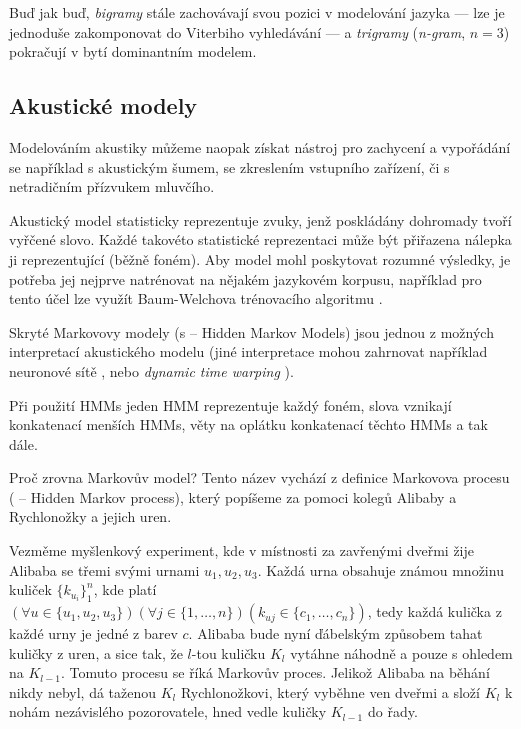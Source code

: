 Buď jak buď, {\sl bigramy} stále zachovávají svou pozici v modelování jazyka --- lze je jednoduše zakomponovat do Viterbiho vyhledávání \cite{goblirsch_1996} --- a {\sl trigramy} ({\sl n-gram}, $n=3$) pokračují v bytí dominantním modelem.

\subsection{Akustické modely}

Modelováním akustiky můžeme naopak získat nástroj pro zachycení a vypořádání se například s akustickým šumem, se zkreslením vstupního zařízení, či s netradičním přízvukem mluvčího.

Akustický model statisticky reprezentuje zvuky, jenž poskládány dohromady tvoří vyřčené slovo. Každé takovéto statistické reprezentaci může být přiřazena nálepka ji reprezentující (běžně foném). Aby model mohl poskytovat rozumné výsledky, je potřeba jej nejprve natrénovat na nějakém jazykovém korpusu, například pro tento účel lze využít Baum-Welchova trénovacího algoritmu \cite{han_2003}.

Skryté Markovovy modely (s -- Hidden Markov Models) \cite{poritz_1988} jsou jednou z možných interpretací akustického modelu (jiné interpretace mohou zahrnovat například neuronové sítě \cite{kingsbury_2009}, nebo {\sl dynamic time warping} \cite{tarar_2010}).

Při použití HMMs jeden HMM reprezentuje každý foném, slova vznikají konkatenací menších HMMs, věty na oplátku konkatenací těchto HMMs a tak dále.

Proč zrovna  Markovův model? Tento název vychází z definice  Markovova procesu ( -- Hidden Markov process), který popíšeme za pomoci kolegů Alibaby a Rychlonožky a jejich uren. 

Vezměme myšlenkový experiment, kde v místnosti za zavřenými dveřmi žije Alibaba se třemi svými urnami $u_1, u_2, u_3$. Každá urna obsahuje známou množinu kuliček $\{k_{u_i}\}_1^n$, kde platí $(\forall u \in \{u_1, u_2, u_3\})(\forall j \in \{1,\dots,n\})(k_{uj} \in \{c_1,\dots,c_n\})$, tedy každá kulička z každé urny je jedné z barev $c$. Alibaba bude nyní ďábelským způsobem tahat kuličky z uren, a sice tak, že $l$-tou kuličku $K_l$  vytáhne náhodně a pouze s ohledem na $K_{l-1}$. Tomuto procesu se říká Markovův proces. Jelikož Alibaba na běhání nikdy nebyl, dá taženou $K_l$ Rychlonožkovi, který vyběhne ven dveřmi a složí $K_l$ k nohám nezávislého pozorovatele, hned vedle kuličky $K_{l-1}$ do řady.

